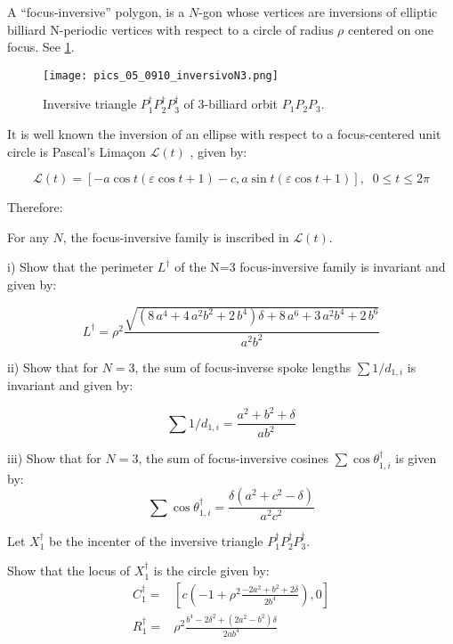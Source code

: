 

\begin{exercise}\label{exer:51}
A ``focus-inversive'' polygon, is a $N$-gon whose vertices are inversions of elliptic billiard N-periodic vertices with respect to a circle of radius $\rho$ centered on one focus. See \cref{fig:chap5_inversiveN3}.

\begin{figure}[H]
    \centering
    \texttt{[image: pics\_05\_0910\_inversivoN3.png]}
    \caption{Inversive triangle $P_1^{\dag}P_2^{\dag}P_3^{\dag}$ of 3-billiard orbit $P_1P_2P_3$.}
    \label{fig:chap5_inversiveN3}
\end{figure}

It is well known the inversion of an ellipse with respect to a focus-centered unit circle is Pascal's Limaçon $\mathcal{L}(t)$ \cite{ferreol2020-limacon}, given by:

\[ \mathcal{L}(t)=\left[-a \cos{t} (\varepsilon  \cos{t}+1)-c,a \sin{t} (\varepsilon \cos{t}+1)\right],\;\;0{\leq}t{\leq}2\pi
\]

\noindent Therefore:

For any $N$, the focus-inversive family is inscribed in $\mathcal{L}(t)$.

\noindent i) Show that 
the perimeter $L^\dagger$ of the N=3 focus-inversive family is invariant and given by:

\[L^\dagger=\rho^2 \frac {\sqrt { \left( 8\,{a}^{4}+4\,{a}^{2}{b}^{2}+2\,{b}^{4}
 \right) \delta+8\,{a}^{6}+3\,{a}^{2}{b}^{4}+2\,{b}^{6}}}{{a}^{2}{b}^{
2}}\]
 
\noindent ii) Show that for $N=3$, the sum of focus-inverse spoke lengths $\sum{1/d_{1,i}}$ is invariant and given by:

\[  \sum{1/d_{1,i}}=\frac {{a}^{2}+{b}^{2}+\delta}{a{b}^{
2}}
\] 

\noindent iii) Show that for $N=3$, the sum of focus-inversive cosines $\sum\cos{\theta_{1,i}^\dagger}$ is given by:
\[\sum\cos{\theta_{1,i}^\dagger}=\frac{\delta (a^2+c^2-\delta)}{a^2c^2}\]


\end{exercise}


\begin{exercise}\label{exer:52} Let $X_1^{\dag}$ be the incenter of the inversive triangle $P_1^{\dag}P_2^{\dag}P_3^{\dag}$. 

Show that the locus of $X_1^\dag$ is the circle given by:
\begin{align*}
C_1^\dagger=&\left[c\left(-1+\rho^2\frac{-2a^2+b^2+2\delta}{2b^4}\right), 0\right]\\
R_1^\dagger=&\rho^2\frac{b^4 -2\delta^2+(2a^2-b^2)\delta}{2ab^4}
\end{align*}
\end{exercise}



